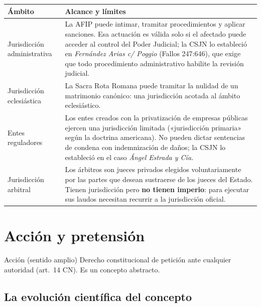 \documentclass[12pt,oneside]{book}
\renewcommand{\arraystretch}{1.15}
\begin{document}
\begin{table}[H]
\centering
\renewcommand{\arraystretch}{1.25}
\begin{tabularx}{\textwidth}{>{\RaggedRight\arraybackslash}p{}>{\RaggedRight\arraybackslash}X}
\toprule
\textbf{Ámbito} & \textbf{Alcance y límites} \\
\midrule
Jurisdicción administrativa & La AFIP puede intimar, tramitar procedimientos y aplicar sanciones. Esa actuación es válida solo si el afectado puede acceder al control del Poder Judicial; la CSJN lo estableció en \textit{Fernández Arias c/ Poggio} (Fallos 247:646), que exige que todo procedimiento administrativo habilite la revisión judicial. \\
\addlinespace
Jurisdicción eclesiástica & La Sacra Rota Romana puede tramitar la nulidad de un matrimonio canónico: una jurisdicción acotada al ámbito eclesiástico. \\
\addlinespace
Entes reguladores & Los entes creados con la privatización de empresas públicas ejercen una jurisdicción limitada («jurisdicción primaria» según la doctrina americana). No pueden dictar sentencias de condena con indemnización de daños; la CSJN lo estableció en el caso \textit{Ángel Estrada y Cía.} \\
\addlinespace
Jurisdicción arbitral & Los árbitros son jueces privados elegidos voluntariamente por las partes que desean sustraerse de los jueces del Estado. Tienen jurisdicción pero \textbf{no tienen imperio}: para ejecutar sus laudos necesitan recurrir a la jurisdicción oficial. \\
\bottomrule
\end{tabularx}
\end{table}


\section{Acción y pretensión}

\begin{definicion}{Acción (sentido amplio)}
Derecho constitucional de petición ante cualquier autoridad (art.~14 CN). Es un concepto abstracto.
\end{definicion}

\subsection{La evolución científica del concepto}
\end{document}
